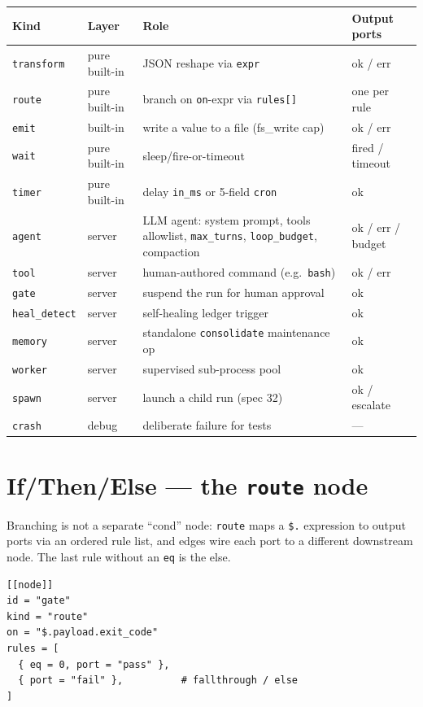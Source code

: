 \documentclass[
	fontsize=10pt,
	twoside=false,
	secnumdepth=2,
	open=any,
]{kaobook}
\begin{document}
\begin{longtable}{@{}llll@{}}
\toprule
\textbf{Kind} & \textbf{Layer} & \textbf{Role} & \textbf{Output ports} \\
\midrule
\endhead
\texttt{transform} & pure built-in & JSON reshape via \texttt{expr} & ok / err \\
\texttt{route} & pure built-in & branch on \texttt{on}-expr via \texttt{rules[]} & one per rule \\
\texttt{emit} & built-in & write a value to a file (fs\_write cap) & ok / err \\
\texttt{wait} & pure built-in & sleep/fire-or-timeout & fired / timeout \\
\texttt{timer} & pure built-in & delay \texttt{in\_ms} or 5-field \texttt{cron} & ok \\
\texttt{agent} & server & LLM agent: system prompt, tools allowlist, \texttt{max\_turns}, \texttt{loop\_budget}, compaction & ok / err / budget \\
\texttt{tool} & server & human-authored command (e.g.\ \texttt{bash}) & ok / err \\
\texttt{gate} & server & suspend the run for human approval & ok \\
\texttt{heal\_detect} & server & self-healing ledger trigger & ok \\
\texttt{memory} & server & standalone \texttt{consolidate} maintenance op & ok \\
\texttt{worker} & server & supervised sub-process pool & ok \\
\texttt{spawn} & server & launch a child run (spec 32) & ok / escalate \\
\texttt{crash} & debug & deliberate failure for tests & --- \\
\bottomrule
\end{longtable}

\section{If/Then/Else — the \texttt{route} node}

Branching is not a separate ``cond'' node: \texttt{route} maps a
\texttt{\$.} expression to output ports via an ordered rule list, and
edges wire each port to a different downstream node. The last rule
without an \texttt{eq} is the else.

\begin{lstlisting}
[[node]]
id = "gate"
kind = "route"
on = "$.payload.exit_code"
rules = [
  { eq = 0, port = "pass" },
  { port = "fail" },          # fallthrough / else
]
\end{lstlisting}
\end{document}
